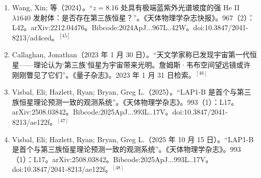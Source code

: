 \begin{enumerate}
\item Wang, Xin; 等（2024）。“$z=8.16$ 处具有极端蓝紫外光谱坡度的强 He II $\lambda1640$ 发射体：是否存在第三族恒星？”。《天体物理学杂志快报》。967（2）：L42。arXiv:2212.04476。Bibcode:2024ApJ...967L..42W。doi:10.3847/2041-8213/ad4ced。$^{[45]}$
\item Callaghan, Jonathan（2023 年 1 月 30 日）。“天文学家称已发现宇宙第一代恒星——理论认为‘第三族’恒星为宇宙带来光明。詹姆斯·韦布空间望远镜或许刚刚瞥见了它们”。《量子杂志》。2023 年 1 月 31 日检索。$^{[46]}$
\item Visbal, Eli; Hazlett, Ryan; Bryan, Greg L.（2025）。“LAP1-B 是首个与第三族恒星理论预测一致的观测系统”。《天体物理学杂志》。993（1）：L17。arXiv:2508.03842。Bibcode:2025ApJ...993L..17V。doi:10.3847/2041-8213/ae122f。$^{[47]}$
\item Visbal, Eli; Hazlett, Ryan; Bryan, Greg L.（2025 年 10 月 15 日）。“LAP1-B 是首个与第三族恒星理论预测一致的观测系统”。《天体物理学杂志》。993（1）：L17。arXiv:2508.03842。Bibcode:2025ApJ...993L..17V。doi:10.3847/2041-8213/ae122f。$^{[48]}$
\end{enumerate}